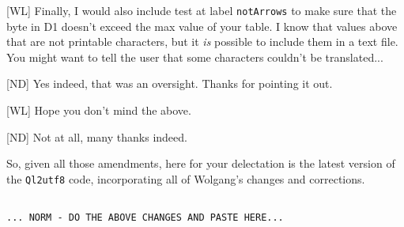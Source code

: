 [WL] Finally, I would also include  test at label \texttt{notArrows} to make sure that the byte in D1 doesn't exceed the max value of your table. I know that values above that are not printable characters, but it \emph{is} possible to include them in a text file. You might want to tell the user that some characters couldn't be translated...

[ND] Yes indeed, that was an oversight. Thanks for pointing it out.

[WL] Hope you don't mind the above.

[ND] Not at all, many thanks indeed.

So, given all those amendments, here for your delectation is the latest version of the \texttt{Ql2utf8} code, incorporating all of Wolgang's changes and corrections.


\begin{lstlisting}[firstnumber=1, caption={Wolfgang's improved ql2utf8 Utility}]

... NORM - DO THE ABOVE CHANGES AND PASTE HERE...

\end{lstlisting}
